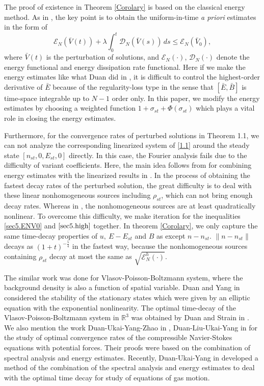 \documentclass[11pt]{amsart}
\numberwithin{equation}{section}
\begin{document}
The proof of existence in Theorem \ref{Corolary} is based on the
classical energy method. As in \cite{Duan}, the key point is to
obtain the uniform-in-time {\it a priori} estimates in the form of
$$
\mathcal{E}_N(\bar{V}(t))+\lambda
\int_0^t\mathcal{D}_N(\bar{V}(s))\,ds\leq \mathcal{E}_N(\bar{V}_0),
$$
where $\bar{V}(t)$ is the perturbation of solutions, and
$\mathcal{E}_N(\cdot)$, $\mathcal{D}_N(\cdot)$ denote the energy
functional and energy dissipation rate functional. Here if we make
the energy estimates like what Duan  did in \cite{Duan}, it is
difficult to control the highest-order derivative of $\bar{E}$
because of the regularity-loss type in the sense that
$[\bar{E},\bar{B}]$ is time-space integrable up to $N-1$ order only.
In this paper, we modify the energy estimates by choosing a weighted
function $1+\sigma_{st}+\Phi(\sigma_{st})$ which plays a vital role
in closing the energy estimates.

Furthermore,  for the convergence rates of perturbed solutions in
Theorem 1.1, we can not analyze the corresponding linearized system
of \eqref{1.1} around the steady state $[n_{st},0,E_{st},0]$
directly. In this case, the Fourier analysis fails due to the
difficulty of variant coefficients. Here, the main idea follows from
\cite{Duan} for combining energy estimates with the linearized
results in \cite{Duan}. In the process of obtaining  the fastest
decay rates of the perturbed solution, the great difficulty is to
deal with these linear nonhomogeneous sources including $\rho_{st}$,
which can not bring enough decay rates. Whereas in \cite{Duan}, the
nonhomogeneous sources are at least quadratically nonlinear. To
overcome this difficulty, we make iteration for the inequalities
\eqref{sec5.ENV0} and $\eqref{sec5.high}$ together. In theorem
\ref{Corolary}, we only capture the same time-decay properties of
$u,\ E-E_{st}$ and $B$ as \cite{Duan} except $n-n_{st}$.
$\|n-n_{st}\|$ decays as $(1+t)^{-\frac{5}{4}}$ in the fastest way,
because the nonhomogeneous sources containing $\rho_{st}$ decay at
most the same as $\sqrt{\mathcal{E}^h_N(\cdot)}$.

The similar work was done for Vlasov-Poisson-Boltzmann system, where
the background density is also a function of spatial variable. Duan
and Yang in \cite{RY} considered the stability of the stationary
states which were given by an elliptic equation with the exponential
nonlinearity. The optimal time-decay of the Vlasov-Poisson-Boltzmann
system in $\mathbb{R}^{3}$ was obtained by Duan and Strain in
\cite{DS}. We also mention the work Duan-Ukai-Yang-Zhao in
\cite{RSYZ}, Duan-Liu-Ukai-Yang in \cite{DLUY} for the study of
optimal convergence rates of the compressible Navier-Stokes
equations with potential forces. Their proofs were based on the
combination of spectral analysis and energy estimates. Recently,
Duan-Ukai-Yang in \cite{RSY} developed a method of the combination
of the spectral analysis and energy estimates to deal with the
optimal time decay for study of equations of gas motion.
\end{document}
